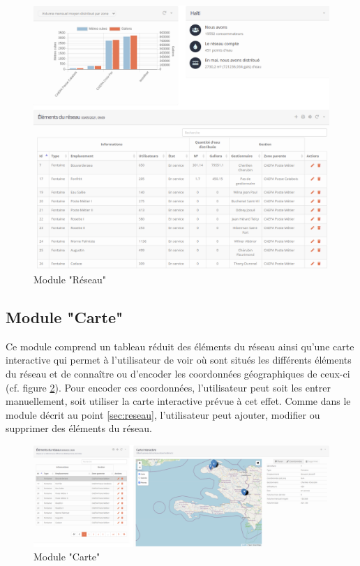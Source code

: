 \documentclass{EPL-master-thesis-covers-FR}
\begin{document}
				\begin{figure}[H]
					\centering
					\includegraphics[width=1\textwidth]{images/water_elem}
					\caption{Module "Réseau"}
					\label{fig:reseau}
				\end{figure}
				
				
			\subsection*{Module "Carte"}
				Ce module comprend un tableau réduit des éléments du réseau ainsi qu'une carte interactive qui permet à l'utilisateur de voir où sont situés les différents éléments du réseau et de connaître ou d'encoder les coordonnées géographiques de ceux-ci (cf. figure \ref{carte}). Pour encoder ces coordonnées, l'utilisateur peut soit les entrer manuellement, soit utiliser la carte interactive prévue à cet effet. Comme dans le module décrit au point \ref{sec:reseau}, l'utilisateur peut ajouter, modifier ou supprimer des éléments du réseau.
			
				\begin{figure}[H]
					\centering
					\includegraphics[width=1\textwidth]{images/map}
					\caption{Module "Carte"}
					\label{carte}
				\end{figure}
				
\end{document}

